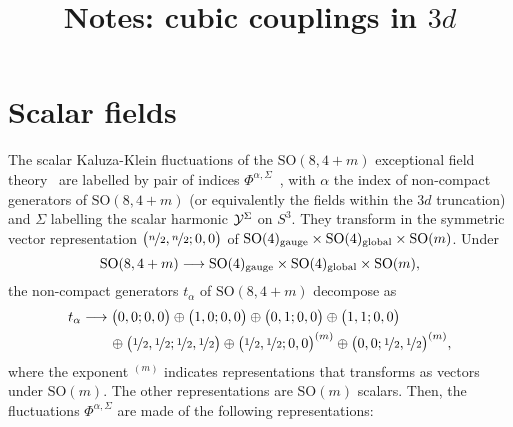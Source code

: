 \documentclass[11pt]{article}
\title{Notes: cubic couplings in $3d$}
\author{}
\newcommand{\SO}{\ensuremath{\mathrm{SO}}\xspace}
\begin{document}
\maketitle

\section*{Scalar fields}
The scalar Kaluza-Klein fluctuations of the $\SO(8,4+m)$ exceptional field theory~\cite{Hohm:2017wtr} are labelled by pair of indices $\Phi^{\alpha,\Sigma}$~\cite{Eloy:2020uix}, with $\alpha$ the index of non-compact generators of $\SO(8,4+m)$ (or equivalently the fields within the $3d$ truncation) and $\Sigma$ labelling the scalar harmonic ${\cal Y}^{\Sigma}$ on $S^{3}$. They transform in the symmetric vector representation $\big(\nicefrac{n}{2},\nicefrac{n}{2};0,0\big)$ of $\SO(4)_{\rm gauge} \times \SO(4)_{\rm global} \times \SO(m)$. Under
\begin{equation}
	\SO(8,4+m) \longrightarrow \SO(4)_{\rm gauge} \times \SO(4)_{\rm global} \times \SO(m),
\end{equation}
the non-compact generators $t_{\alpha}$ of $\SO(8,4+m)$ decompose as
\begin{equation}
	\begin{aligned}
		t_{\alpha} &\longrightarrow \big(0,0;0,0\big) \oplus \big(1,0;0,0\big) \oplus \big(0,1;0,0\big) \oplus \big(1,1;0,0\big) \\
		& \qquad \oplus \big(\nicefrac{1}{2},\nicefrac{1}{2};\nicefrac{1}{2},\nicefrac{1}{2}\big) \oplus \big(\nicefrac{1}{2},\nicefrac{1}{2};0,0\big)^{(m)} \oplus \big(0,0;\nicefrac{1}{2},\nicefrac{1}{2}\big)^{(m)},
	\end{aligned}
\end{equation}
where the exponent ${}^{(m)}$ indicates representations that transforms as vectors under $\SO(m)$. The other representations are $\SO(m)$ scalars. Then, the fluctuations $\Phi^{\alpha,\Sigma}$ are made of the following representations:
\end{document}
